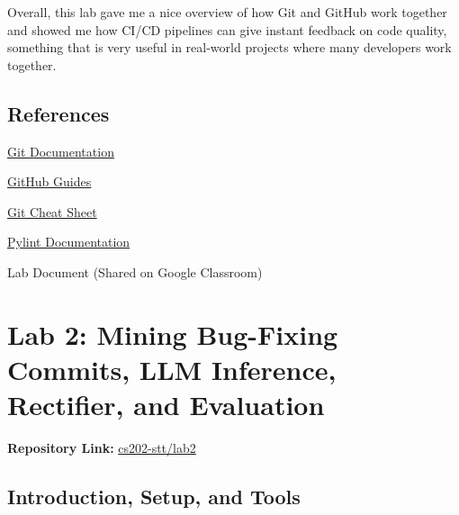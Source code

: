 \documentclass[10pt,a4paper]{report}
\begin{document}
Overall, this lab gave me a nice overview of how Git and GitHub work together and showed me how CI/CD pipelines can give instant feedback on code quality, something that is very useful in real-world projects where many developers work together.




\section{References}
\begin{enumerate}[label={[\arabic*]}, itemsep=0.05em, topsep=0pt]
    \item \href{https://git-scm.com/doc}{Git Documentation}
    \item \href{https://docs.github.com/en}{GitHub Guides}
    \item \href{https://education.github.com/git-cheat-sheet-education.pdf}{Git Cheat Sheet}
    \item \href{https://docs.pylint.org/}{Pylint Documentation}
    \item Lab Document (Shared on Google Classroom)
\end{enumerate}























\chapter{Lab 2: Mining Bug-Fixing Commits, LLM Inference, Rectifier, and Evaluation}

\textbf{Repository Link:} \href{https://github.com/ShardulJunagade/cs202-stt/tree/main/lab2}{cs202-stt/lab2}

\section{Introduction, Setup, and Tools}
\end{document}
